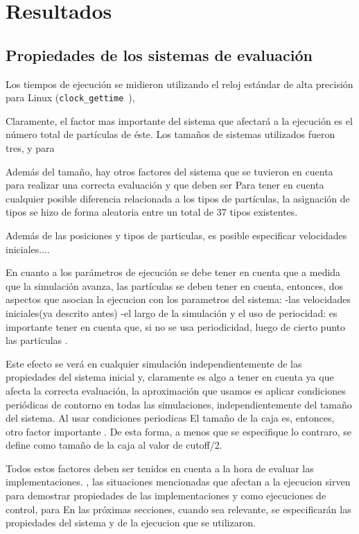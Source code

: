 \chapter{Resultados}
\section{Propiedades de los sistemas de evaluación}

Los tiempos de ejecuci\'on se midieron utilizando el reloj est\'andar de alta precisi\'on para Linux (\texttt{clock\_gettime}~\cite{LinuxDocumentation}), 


Claramente, el factor mas importante del sistema que afectará a la ejecución es el número total de partículas de éste. Los tamaños de sistemas utilizados fueron tres, y para 

Además del tamaño, hay otros factores del sistema que se tuvieron en cuenta para realizar una correcta evaluación y que deben ser 
Para tener en cuenta cualquier posible diferencia relacionada a los tipos de partículas, la asignación de tipos se hizo de forma aleatoria entre un total de 37 tipos existentes.

Además de las posiciones y tipos de particulas, es posible especificar velocidades iniciales....

En cuanto a los parámetros de ejecución se debe tener en cuenta que a medida que la simulación avanza, las partículas 
se deben tener en cuenta, entonces, dos aspectos que asocian la ejecucion con los parametros del sistema:
-las velocidades iniciales(ya descrito antes)
-el largo de la simulación y el uso de periocidad: es importante tener en cuenta que, si no se usa periodicidad, luego de cierto punto las particulas . 

Este efecto se verá en cualquier simulación independientemente de las propiedades del sistema inicial y, claramente es algo a tener en cuenta ya que afecta la correcta evaluación, la aproximación que usamos es aplicar condiciones periódicas de contorno en todas las simulaciones, independientemente del tamaño del sistema.
Al usar condiciones periodicas 
El tamaño de la caja es, entonces, otro factor importante . De esta forma, a menos que se especifique lo contraro, se define como tamaño de la caja al valor de cutoff/2.

Todos estos factores deben ser tenidos en cuenta a la hora de evaluar las implementaciones. 
, las situaciones mencionadas que afectan a la ejecucion sirven para demostrar propiedades de las implementaciones y como ejecuciones de control, para 
En las próximas secciones, cuando sea relevante, se especificarán las propiedades del sistema y de la ejecucion que se utilizaron.


